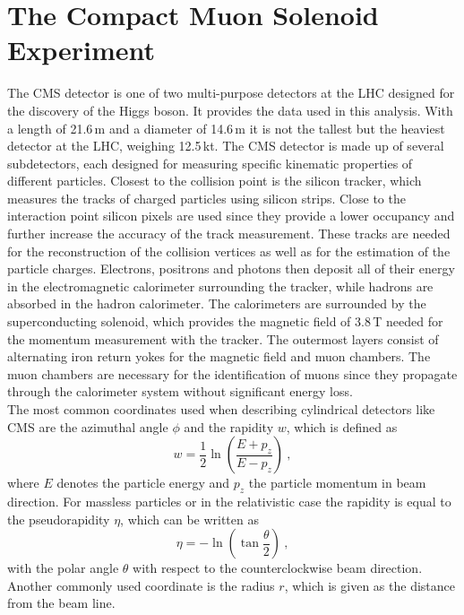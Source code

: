 \section{The Compact Muon Solenoid Experiment}
The CMS detector is one of two multi-purpose detectors at the LHC designed for the discovery of the Higgs boson. It provides the data used in this analysis. With a length of 21.6\,m and a diameter of 14.6\,m it is not the tallest but the heaviest detector at the LHC, weighing 12.5\,kt. The CMS detector is made up of several subdetectors, each designed for measuring specific kinematic properties of different particles. Closest to the collision point is the silicon tracker, which measures the tracks of charged particles using silicon strips. Close to the interaction point silicon pixels are used since they provide a lower occupancy and further increase the accuracy of the track measurement. These tracks are needed for the reconstruction of the collision vertices as well as for the estimation of the particle charges. Electrons, positrons and photons then deposit all of their energy in the electromagnetic calorimeter surrounding the tracker, while hadrons are absorbed in the hadron calorimeter. The calorimeters are surrounded by the superconducting solenoid, which provides the magnetic field of 3.8\,T needed for the momentum measurement with the tracker. The outermost layers consist of alternating iron return yokes for the magnetic field and muon chambers. The muon chambers are necessary for the identification of muons since they propagate through the calorimeter system without significant energy loss.\\

\noindent The most common coordinates used when describing cylindrical detectors like CMS are the azimuthal angle $\phi$ and the rapidity $w$, which is defined as
\begin{equation}
w = \frac{1}{2} \ln \left( \frac{E+p_z}{E-p_z} \right) ~,
\end{equation}
where $E$ denotes the particle energy and $p_z$ the particle momentum in beam direction. For massless particles or in the relativistic case the rapidity is equal to the pseudorapidity $\eta$, which can be written as
\begin{equation}
\eta = -\ln \left( \tan \frac{\theta}{2} \right) ~,
\end{equation}
with the polar angle $\theta$ with respect to the counterclockwise beam direction. Another commonly used coordinate is the radius $r$, which is given as the distance from the beam line.\\


